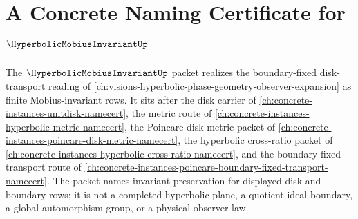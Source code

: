 \chapter{A Concrete Naming Certificate for $\HyperbolicMobiusInvariantUp$}
\label{ch:concrete-instances-hyperbolic-mobius-invariant-namecert}

The $\HyperbolicMobiusInvariantUp$ packet realizes the boundary-fixed disk-transport reading of \autoref{ch:visions-hyperbolic-phase-geometry-observer-expansion} as finite Mobius-invariant rows. It sits after the disk carrier of \autoref{ch:concrete-instances-unitdisk-namecert}, the metric route of \autoref{ch:concrete-instances-hyperbolic-metric-namecert}, the Poincare disk metric packet of \autoref{ch:concrete-instances-poincare-disk-metric-namecert}, the hyperbolic cross-ratio packet of \autoref{ch:concrete-instances-hyperbolic-cross-ratio-namecert}, and the boundary-fixed transport route of \autoref{ch:concrete-instances-poincare-boundary-fixed-transport-namecert}. The packet names invariant preservation for displayed disk and boundary rows; it is not a completed hyperbolic plane, a quotient ideal boundary, a global automorphism group, or a physical observer law.

